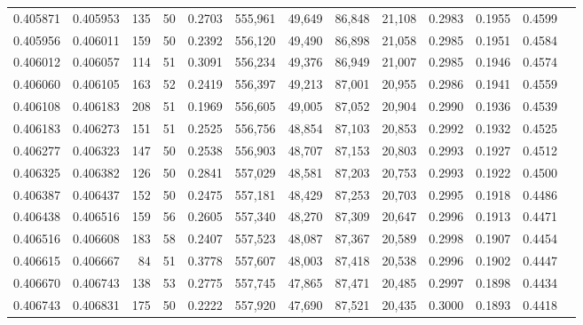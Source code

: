 \begin{tabular}{rrrrrrrrrrrrr}
0.405871 & 0.405953 &   135 &  50 &                                     0.2703 & 555,961 &  49,649 &  86,848 &  21,108 & 0.2983 & 0.1955 & 0.4599 \\
0.405956 & 0.406011 &   159 &  50 &                                     0.2392 & 556,120 &  49,490 &  86,898 &  21,058 & 0.2985 & 0.1951 & 0.4584 \\
0.406012 & 0.406057 &   114 &  51 &                                     0.3091 & 556,234 &  49,376 &  86,949 &  21,007 & 0.2985 & 0.1946 & 0.4574 \\
0.406060 & 0.406105 &   163 &  52 &                                     0.2419 & 556,397 &  49,213 &  87,001 &  20,955 & 0.2986 & 0.1941 & 0.4559 \\
0.406108 & 0.406183 &   208 &  51 &                                     0.1969 & 556,605 &  49,005 &  87,052 &  20,904 & 0.2990 & 0.1936 & 0.4539 \\
0.406183 & 0.406273 &   151 &  51 &                                     0.2525 & 556,756 &  48,854 &  87,103 &  20,853 & 0.2992 & 0.1932 & 0.4525 \\
0.406277 & 0.406323 &   147 &  50 &                                     0.2538 & 556,903 &  48,707 &  87,153 &  20,803 & 0.2993 & 0.1927 & 0.4512 \\
0.406325 & 0.406382 &   126 &  50 &                                     0.2841 & 557,029 &  48,581 &  87,203 &  20,753 & 0.2993 & 0.1922 & 0.4500 \\
0.406387 & 0.406437 &   152 &  50 &                                     0.2475 & 557,181 &  48,429 &  87,253 &  20,703 & 0.2995 & 0.1918 & 0.4486 \\
0.406438 & 0.406516 &   159 &  56 &                                     0.2605 & 557,340 &  48,270 &  87,309 &  20,647 & 0.2996 & 0.1913 & 0.4471 \\
0.406516 & 0.406608 &   183 &  58 &                                     0.2407 & 557,523 &  48,087 &  87,367 &  20,589 & 0.2998 & 0.1907 & 0.4454 \\
0.406615 & 0.406667 &    84 &  51 &                                     0.3778 & 557,607 &  48,003 &  87,418 &  20,538 & 0.2996 & 0.1902 & 0.4447 \\
0.406670 & 0.406743 &   138 &  53 &                                     0.2775 & 557,745 &  47,865 &  87,471 &  20,485 & 0.2997 & 0.1898 & 0.4434 \\
0.406743 & 0.406831 &   175 &  50 &                                     0.2222 & 557,920 &  47,690 &  87,521 &  20,435 & 0.3000 & 0.1893 & 0.4418 \\

\end{tabular}

